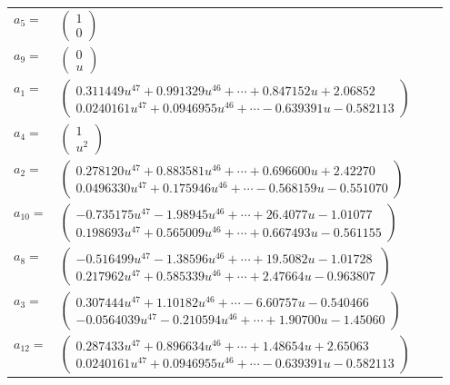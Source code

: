 \documentclass[1p]{elsarticle_modified}
\theoremstyle{definition}
\begin{document}
\begin{tabular}{m{7pt} m{180pt} m{7pt} m{180pt} }
\flushright $a_{5}=$&$\begin{pmatrix}1\\0\end{pmatrix}$ \\
\flushright $a_{9}=$&$\begin{pmatrix}0\\u\end{pmatrix}$ \\
\flushright $a_{1}=$&$\begin{pmatrix}0.311449 u^{47}+0.991329 u^{46}+\cdots+0.847152 u+2.06852\\0.0240161 u^{47}+0.0946955 u^{46}+\cdots-0.639391 u-0.582113\end{pmatrix}$ \\
\flushright $a_{4}=$&$\begin{pmatrix}1\\u^2\end{pmatrix}$ \\
\flushright $a_{2}=$&$\begin{pmatrix}0.278120 u^{47}+0.883581 u^{46}+\cdots+0.696600 u+2.42270\\0.0496330 u^{47}+0.175946 u^{46}+\cdots-0.568159 u-0.551070\end{pmatrix}$ \\
\flushright $a_{10}=$&$\begin{pmatrix}-0.735175 u^{47}-1.98945 u^{46}+\cdots+26.4077 u-1.01077\\0.198693 u^{47}+0.565009 u^{46}+\cdots+0.667493 u-0.561155\end{pmatrix}$ \\
\flushright $a_{8}=$&$\begin{pmatrix}-0.516499 u^{47}-1.38596 u^{46}+\cdots+19.5082 u-1.01728\\0.217962 u^{47}+0.585339 u^{46}+\cdots+2.47664 u-0.963807\end{pmatrix}$ \\
\flushright $a_{3}=$&$\begin{pmatrix}0.307444 u^{47}+1.10182 u^{46}+\cdots-6.60757 u-0.540466\\-0.0564039 u^{47}-0.210594 u^{46}+\cdots+1.90700 u-1.45060\end{pmatrix}$ \\
\flushright $a_{12}=$&$\begin{pmatrix}0.287433 u^{47}+0.896634 u^{46}+\cdots+1.48654 u+2.65063\\0.0240161 u^{47}+0.0946955 u^{46}+\cdots-0.639391 u-0.582113\end{pmatrix}$ \\

\end{tabular}
\end{document}
